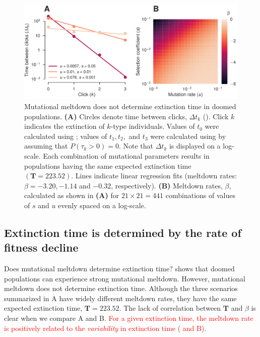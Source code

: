 \documentclass[9pt,lineno]{elife}
\newcommand{\red}{\textcolor{red}}
\begin{document}
\begin{figure}[ht!]
\centering
\includegraphics[width=.71\linewidth]{melt.pdf}
\caption{Mutational meltdown does not determine extinction time in doomed populations.  
%
\textbf{(A)} Circles denote time between clicks, $\Delta t_k$ ().  Click $k$ indicates the extinction of $k$-type individuals.  Values of $t_0$ were calculated using ; values of $t_1, t_2,$ and $t_3$ were calculated using  by assuming that $P(\tau_{k} > 0) = 0$.
Note that $\Delta t_k$ is displayed on a log-scale.  Each combination of mutational parameters results in populations having the same expected extinction time $(\mathbf{T} = 223.52)$.  Lines indicate linear regression fits (meltdown rates: $\beta = -3.20, -1.14$ and $-0.32$, respectively).
%
\textbf{(B)} Meltdown rates, $\beta$, calculated as shown in \textbf{(A)} for $21\times21=441$ combinations of values of $s$ and $u$ evenly spaced on a log-scale.
}
\label{fig:melt}
\end{figure}


\subsection{Extinction time is determined by the rate of fitness decline}


Does mutational meltdown determine extinction time? 
%
 shows that doomed populations can experience strong mutational meltdown.  However, mutational meltdown does not determine extinction time.  Although the three scenarios summarized in A have widely different meltdown rates, they have the same expected extinction time, $\mathbf{T} = 223.52$.  The lack of correlation between $\mathbf{T}$ and $\beta$ is clear when we compare A and B.
\red{For a given extinction time, the meltdown rate is positively related to the \textit{variability} in extinction time ( and B).}
\end{document}
